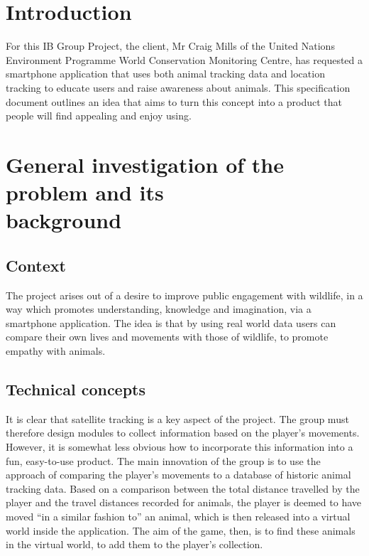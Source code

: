 \documentclass[12pt,a4paper,twoside]{article}
\begin{document}

\newpage
\pagestyle{empty}
\cleardoublepage                             %
\newpage

\section{Introduction}

For this IB Group Project, the client, Mr Craig Mills of the United Nations Environment Programme World Conservation Monitoring Centre, has requested a smartphone application that uses both animal tracking data and location tracking to educate users and raise awareness about animals. This specification document outlines an idea that aims to turn this concept into a product that people will find appealing and enjoy using.

\section{General investigation of the problem and its \\ background}
\subsection{Context}

The project arises out of a desire to improve public engagement with wildlife, in a way which promotes understanding, knowledge and imagination, via a smartphone application. 
The idea is that by using real world data users can compare their own lives and movements with those of wildlife, to promote empathy with animals.

\subsection{Technical concepts}
It is clear that satellite tracking is a key aspect of the project.
The group must therefore design modules to collect information based on the player's movements.
However, it is somewhat less obvious how to incorporate this information into a fun, easy-to-use product.
The main innovation of the group is to use the approach of comparing the player's movements to a database of historic animal tracking data.
Based on a comparison between the total distance travelled by the player and the travel distances recorded for animals, the player is deemed to have moved ``in a similar fashion to'' an animal, which is then released into a virtual world inside the application.
The aim of the game, then, is to find these animals in the virtual world, to add them to the player's collection.
\end{document}
